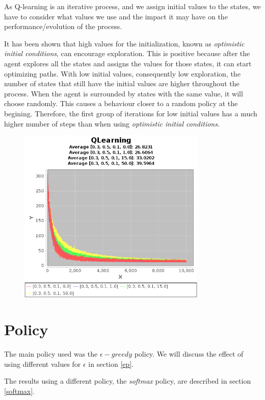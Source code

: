 \documentclass{article}
\begin{document}
As Q-learning is an iterative process, and we assign initial values to the
states, we have to consider what values we use and the impact it may have on the
performance/evolution of the process.

It has been shown that high values for the initialization, known as \emph{optimistic
initial conditions}, can encourage exploration. This is positive because after
the agent explores all the states and assigns the values for those states, it can
start optimizing paths.
With low initial values, consequently low exploration, the number of states that
still have the initial values are higher throughout the process. When the agent
is surrounded by states with the same value, it will choose randomly. This causes a
behaviour closer to a random policy at the begining. Therefore, the first group of
iterations for low initial values has a much higher number of steps than when using \emph{optimistic
initial conditions}.

\begin{figure}[htbp]
\centering
\includegraphics[width=0.8\textwidth]{res/alpha_03_gama_05_epsilon_01IV_00_to_50.png}
\end{figure}

\section{Policy}
The main policy used was the $\epsilon-greedy$ policy. We will discuss the effect of using different values for $\epsilon$ in section \ref{ep}.

The results using a different policy, the \emph{softmax} policy, are described in section \ref{softmax}.
\end{document}
